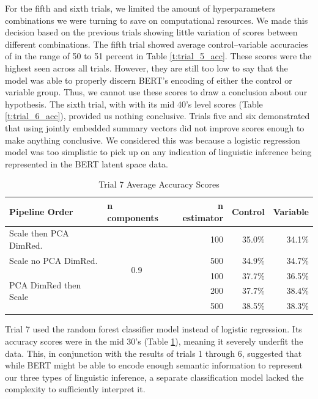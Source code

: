 \documentclass[12pt,letterpaper]{article}
\begin{document}
For the fifth and sixth trials, we limited the amount of hyperparameters combinations we were turning to save on computational resources. We made this decision based on the previous trials showing little variation of scores between different combinations. The fifth trial showed average control--variable accuracies of in the range of 50 to 51 percent in Table \ref{t:trial_5_acc}. These scores were the highest seen across all trials. However, they are still too low to say that the model was able to properly discern BERT's encoding of either the control or variable group. Thus, we cannot use these scores to draw a conclusion about our hypothesis. The sixth trial, with with its mid 40's level scores (Table \ref{t:trial_6_acc}), provided us nothing conclusive. Trials five and six demonstrated that using jointly embedded summary vectors did not improve scores enough to make anything conclusive. We considered this was because a logistic regression model was too simplistic to pick up on any indication of linguistic inference being represented in the BERT latent space data. 



\begin{table}[!ht]
    \centering
    \begin{tabular}{|l|l|r|r|r|}
    \hline
        Pipeline Order & n components & n estimator & Control & Variable \\ \hline
        Scale then PCA DimRed. & \multicolumn{1}{|c|}{\multirow{5}{*}{0.9}} & 100 & 35.0\% & 34.1\% \\ \cline{1-1} \cline{3-5}
        Scale no PCA DimRed. &  & 500 & 34.9\% & 34.7\% \\ \cline{1-1} \cline{3-5}
        \multirow{3}{*}{PCA DimRed then Scale} &  & 100 & 37.7\% & 36.5\% \\ \cline{3-5}
         &  & 200 & 37.7\% & 38.4\% \\ \cline{3-5}
         &  & 500 & 38.5\% & 38.3\% \\ \hline
    \end{tabular}
    \caption{Trial 7 Average Accuracy Scores}
    \label{t:trial_7_acc}
\end{table}


Trial 7 used the random forest classifier model instead of logistic regression. Its accuracy scores were in the mid 30's (Table \ref{t:trial_7_acc}), meaning it severely underfit the data. This, in conjunction with the results of trials 1 through 6, suggested that while BERT might be able to encode enough semantic information to represent our three types of linguistic inference, a separate classification model lacked the complexity to sufficiently interpret it.
\end{document}
